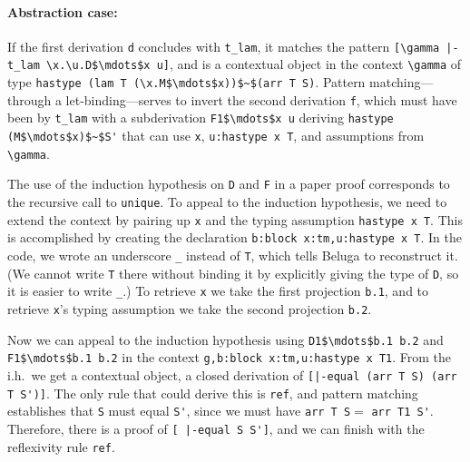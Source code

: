  \paragraph{Abstraction case:}
  If the first derivation \lstinline{d} concludes with \lstinline{t_lam}, it matches
 the pattern \lstinline{[\gamma |-t_lam \x.\u.D$\mdots$x u]}, and is
 a contextual object in the context \lstinline!\gamma! of type
 \lstinline{hastype (lam T (\x.M$\mdots$x))$~$(arr T S)}.
 Pattern matching---through a let-binding---serves to invert the second derivation \lstinline{f}, which
 must have been by \lstinline{t_lam} with a subderivation
 \lstinline{F1$\mdots$x u} deriving \lstinline{hastype (M$\mdots$x)$~$S'} that can use \lstinline{x},
 \lstinline{u:hastype x T}, and assumptions from \lstinline!\gamma!.

 The use of the induction hypothesis on \lstinline{D} and \lstinline{F} in a paper proof
 corresponds to the recursive call to \lstinline{unique}.  To appeal to the
 induction hypothesis, we need to extend the context by pairing up \lstinline{x} and
 the typing assumption \lstinline!hastype x T!. This is accomplished by creating
 the declaration \lstinline!b:block x:tm,u:hastype x T!.  In the
 code, we wrote an underscore \lstinline!_! instead of \lstinline{T},
 which tells Beluga to reconstruct it.  (We cannot write \lstinline{T} there without binding it by
 explicitly giving the type of \lstinline{D}, so it is easier to write \lstinline!_!.)
 To retrieve \lstinline{x} we take the first projection
 \lstinline{b.1}, and to retrieve \lstinline{x}'s typing assumption we take the second projection \lstinline{b.2}.

 Now we can appeal to the induction hypothesis using
 \lstinline!D1$\mdots$b.1 b.2! and \lstinline!F1$\mdots$b.1 b.2! in the context
 \lstinline!g,b:block x:tm,u:hastype x T1!.
  From the i.h.\ we get a
 contextual object, a closed derivation of
 \lstinline![|-equal (arr T S) (arr T S')]!. The only rule that could
 derive this is \lstinline{ref}, and pattern matching establishes that \lstinline{S}
 must equal \lstinline{S'}, since we must have \lstinline!arr T S!$ =$
\lstinline!arr T1 S'!.  Therefore, there is a proof of
\lstinline![ |-equal S S']!,
 and we can finish with the reflexivity rule \lstinline{ref}.

